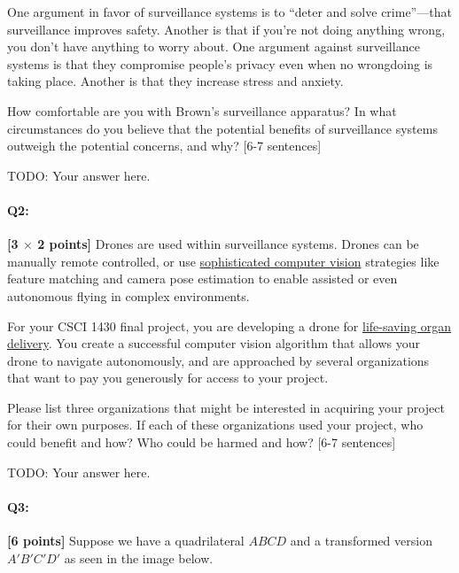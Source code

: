 One argument in favor of surveillance systems is to ``deter and solve crime''---that surveillance improves safety. Another is that if you're not doing anything wrong, you don't have anything to worry about. One argument against surveillance systems is that they compromise people's privacy even when no wrongdoing is taking place. Another is that they increase stress and anxiety.

How comfortable are you with Brown's surveillance apparatus?
In what circumstances do you believe that the potential benefits of surveillance systems outweigh the potential concerns, and why? [6-7 sentences]

\begin{mdframed}
TODO: Your answer here.
\end{mdframed}


\pagebreak
\paragraph{Q2:} \textbf{[3 $\times$ 2 points]} Drones are used within surveillance systems. Drones can be manually remote controlled, or use \href{https://link.springer.com/article/10.1007/s10846-017-0483-z}{sophisticated computer vision} strategies like feature matching and camera pose estimation to enable assisted or even autonomous flying in complex environments.

For your CSCI 1430 final project, you are developing a drone for \href{https://www.cnn.com/2019/05/01/health/drone-organ-transplant-bn-trnd/index.html}{life-saving organ delivery}. You create a successful computer vision algorithm that allows your drone to navigate autonomously, and are approached by several organizations that want to pay you generously for access to your project.

Please list three organizations that might be interested in acquiring your project for their own purposes. If each of these organizations used your project, who could benefit and how? Who could be harmed and how? [6-7 sentences]

\begin{mdframed}
TODO: Your answer here.
\end{mdframed}



\pagebreak
\paragraph{Q3:} \textbf{[6 points]}
Suppose we have a quadrilateral $ABCD$ and a transformed version $A'B'C'D'$ as seen in the image below.

